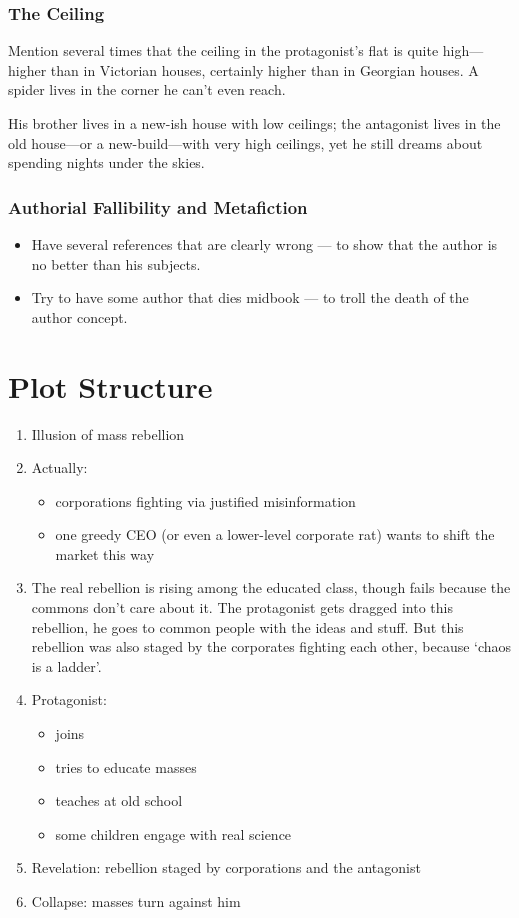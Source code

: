 \documentclass[12pt]{article}
\begin{document}
\subsubsection{The Ceiling}

Mention several times that the ceiling in the protagonist’s flat is quite high—higher than in Victorian houses, certainly higher than in Georgian houses. A spider lives in the corner he can’t even reach.

His brother lives in a new-ish house with low ceilings; the antagonist lives in the old house—or a new-build—with very high ceilings, yet he still dreams about spending nights under the skies.

\subsubsection{Authorial Fallibility and Metafiction}

\begin{itemize}
  \item Have several references that are clearly wrong — to show that the author is no better than his subjects.
  \item Try to have some author that dies midbook — to troll the death of the author concept.
\end{itemize}

\section{Plot Structure}

\begin{enumerate}
  \item Illusion of mass rebellion
  \item Actually:
  \begin{itemize}
    \item corporations fighting via justified misinformation
    \item one greedy CEO (or even a lower-level corporate rat) wants to shift the market this way
  \end{itemize}
  \item The real rebellion is rising among the educated class, though fails because the commons don’t care about it. The protagonist gets dragged into this rebellion, he goes to common people with the ideas and stuff. But this rebellion was also staged by the corporates fighting each other, because ‘chaos is a ladder’.
  \item Protagonist:
  \begin{itemize}
    \item joins
    \item tries to educate masses
    \item teaches at old school
    \item some children engage with real science
  \end{itemize}
  \item Revelation: rebellion staged by corporations and the antagonist
  \item Collapse: masses turn against him
\end{enumerate}
\end{document}
